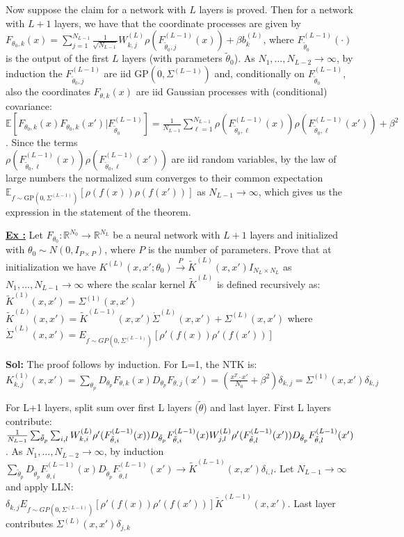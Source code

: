 \documentclass[a4paper,10pt]{article}
\newcounter{exerciseCounter}
\newcommand{\exercise}[1]{%
    \vspace{1mm}
    \stepcounter{exerciseCounter}%
    \color{exerciseBlack}
    \textbf{\underline{Ex \theexerciseCounter:}} #1
}
\newcommand{\solution}[1]{%
    {\color{solutionGray} \textbf{Sol: } #1} %
}
\begin{document}
\begin{scriptsize}
{Now suppose the claim for a network with $L$ layers is proved. Then for a network with $L+1$ layers, we have that the coordinate processes are given by
$F_{\theta_0,k}(x) = \sum_{j=1}^{N_{L-1}}\frac{1}{\sqrt{N_{L-1}}}W_{k,j}^{(L)}\rho(F_{\tilde{\theta}_0,j}^{(L-1)}(x)) + \beta b_k^{(L)}$,
where $F_{\tilde{\theta}_0}^{(L-1)}(\cdot)$ is the output of the first $L$ layers (with parameters $\tilde{\theta}_0$). As $N_1,\ldots,N_{L-2} \to \infty$, by induction the $F_{\tilde{\theta}_0,j}^{(L-1)}$ are iid $\text{GP}(0,\Sigma^{(L-1)})$ and, conditionally on $F_{\tilde{\theta}_0}^{(L-1)}$, also the coordinates $F_{\theta,k}(x)$ are iid Gaussian processes with (conditional) covariance:
$\mathbb{E}[F_{\theta_0,k}(x)F_{\theta_0,k}(x')|F_{\tilde{\theta}_0}^{(L-1)}] = \frac{1}{N_{L-1}}\sum_{\ell=1}^{N_{L-1}}\rho(F_{\tilde{\theta}_0,\ell}^{(L-1)}(x))\rho(F_{\tilde{\theta}_0,\ell}^{(L-1)}(x')) + \beta^2$.
Since the terms \\ $\rho(F_{\tilde{\theta}_0,\ell}^{(L-1)}(x))\rho(F_{\tilde{\theta}_0,\ell}^{(L-1)}(x'))$ are iid random variables, by the law of large numbers the normalized sum converges to their common expectation $\mathbb{E}_{f\sim\text{GP}(0,\Sigma^{(L-1)})}[\rho(f(x))\rho(f(x'))]$ as $N_{L-1} \to \infty$, which gives us the expression in the statement of the theorem.}

\exercise{Let $F_{\theta_0}: \mathbb{R}^{N_0} \to \mathbb{R}^{N_L}$ be a neural network with $L+1$ layers and initialized with $\theta_0 \sim N(0, I_{P\times P})$, where $P$ is the number of parameters. Prove that at initialization we have $K^{(L)}(x,x';\theta_0) \stackrel{P}{\to} \tilde{K}^{(L)}(x,x')I_{N_L\times N_L}$ as $N_1,\ldots,N_{L-1} \to \infty$ where the scalar kernel $\tilde{K}^{(L)}$ is defined recursively as:
$\tilde{K}^{(1)}(x,x') = \Sigma^{(1)}(x,x')$
$\tilde{K}^{(L)}(x,x') = \tilde{K}^{(L-1)}(x,x')\dot{\Sigma}^{(L)}(x,x') + \Sigma^{(L)}(x,x')$
where $\dot{\Sigma}^{(L)}(x,x') = E_{f\sim GP(0,\Sigma^{(L-1)})}[\rho'(f(x))\rho'(f(x'))]$}
\solution{The proof follows by induction. For L=1, the NTK is:
$K^{(1)}_{k,j}(x,x') = \sum_{\theta_p} D_{\theta_p}F_{\theta,k}(x)D_{\theta_p}F_{\theta,j}(x') = (\frac{x^T\cdot x'}{N_0} + \beta^2)\delta_{k,j} = \Sigma^{(1)}(x,x')\delta_{k,j}$

For L+1 layers, split sum over first L layers ($\tilde{\theta}$) and last layer. First L layers contribute:
$\frac{1}{N_{L-1}}\sum_{\tilde{\theta}_p}\sum_{i,l} W^{(L)}_{k,i}\rho'(F^{(L-1)}_{\tilde{\theta},i}(x))D_{\tilde{\theta}_p}F^{(L-1)}_{\tilde{\theta},i}(x) \\ W^{(L)}_{j,l}\rho'(F^{(L-1)}_{\tilde{\theta},l}(x'))D_{\tilde{\theta}_p}F^{(L-1)}_{\tilde{\theta},l}(x')$.
As $N_1,\ldots,N_{L-2} \to \infty$, by induction $\sum_{\tilde{\theta}_p}D_{\tilde{\theta}_p}F^{(L-1)}_{\tilde{\theta},i}(x)D_{\tilde{\theta}_p}F^{(L-1)}_{\tilde{\theta},l}(x') \to \tilde{K}^{(L-1)}(x,x')\delta_{i,l}$.
Let $N_{L-1} \to \infty$ and apply LLN:
$\delta_{k,j}E_{f\sim GP(0,\Sigma^{(L-1)})}[\rho'(f(x))\rho'(f(x'))]\tilde{K}^{(L-1)}(x,x')$.
Last layer contributes $\Sigma^{(L)}(x,x')\delta_{j,k}$}


\end{scriptsize}
\end{document}
